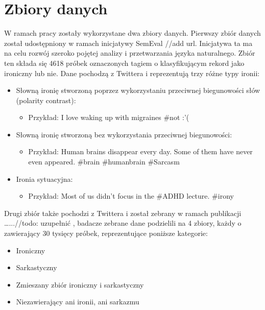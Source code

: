 \newpage %
\section{Zbiory danych}


W ramach pracy zostały wykorzystane dwa zbiory danych. Pierwszy zbiór danych został udostępniony w ramach inicjatywy SemEval //add url. Inicjatywa ta ma na celu rozwój szeroko pojętej analizy i przetwarzania języka naturalnego. Zbiór ten składa się 4618 próbek oznaczonych tagiem o klasyfikującym rekord jako ironiczny lub nie. Dane pochodzą z Twittera i reprezentują trzy różne typy ironii:
\begin{itemize}
    \item Słowną ironię stworzoną poprzez wykorzystaniu przeciwnej biegunowości słów (polarity contrast):
          \begin{itemize}
              \item Przykład: I love waking up with migraines \#not :'(
          \end{itemize}

    \item Słowną ironię stworzoną bez wykorzystania przeciwnej biegunowości:
          \begin{itemize}
              \item Przykład: Human brains disappear every day. Some of them have never even appeared. \#brain \#humanbrain \#Sarcasm
          \end{itemize}

    \item Ironia sytuacyjna:
          \begin{itemize}
              \item Przykład: Most of us didn't focus in the \#ADHD lecture. \#irony
          \end{itemize}
\end{itemize}



Drugi zbiór także pochodzi z Twittera i został zebrany w ramach publikacji …...//todo: uzupełnić  , badacze zebrane dane podzielili na 4 zbiory, każdy o zawierający 30 tysięcy próbek,  reprezentujące poniższe kategorie:
\begin{itemize}
    \item Ironiczny
    \item Sarkastyczny
    \item Zmieszany zbiór ironiczny i sarkastyczny
    \item Niezawierający ani ironii, ani sarkazmu

\end{itemize}

